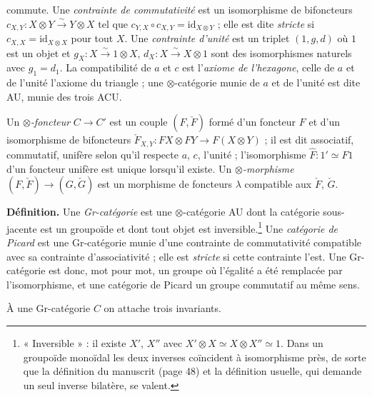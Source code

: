 \documentclass[11pt,a4paper]{article}
\begin{document}
commute. Une \emph{contrainte de commutativité} est un isomorphisme de
bifoncteurs $c_{X,Y} : X \otimes Y \xrightarrow{\sim} Y \otimes X$ tel que
$c_{Y,X} \circ c_{X,Y} = \mathrm{id}_{X \otimes Y}$ ; elle est dite
\emph{stricte} si $c_{X,X} = \mathrm{id}_{X \otimes X}$ pour tout $X$. Une
\emph{contrainte d'unité} est un triplet $(1, g, d)$ où $1$ est un objet et
$g_{X} : X \xrightarrow{\sim} 1 \otimes X$, $d_{X} : X \xrightarrow{\sim} X
\otimes 1$ sont des isomorphismes naturels avec $g_{1} = d_{1}$. La
compatibilité de $a$ et $c$ est l'\emph{axiome de l'hexagone}, celle de $a$ et
de l'unité l'axiome du triangle ; une $\otimes$-catégorie munie de $a$ et de
l'unité est dite AU, munie des trois ACU.

Un \emph{$\otimes$-foncteur} $C \to C'$ est un couple $(F, \check{F})$ formé
d'un foncteur $F$ et d'un isomorphisme de bifoncteurs $\check{F}_{X,Y} : FX
\otimes FY \to F(X \otimes Y)$ ; il est dit associatif, commutatif, unifère
selon qu'il respecte $a$, $c$, l'unité ; l'isomorphisme $\hat{F} : 1' \simeq
F1$ d'un foncteur unifère est unique lorsqu'il existe. Un
\emph{$\otimes$-morphisme} $(F,\check{F}) \to (G,\check{G})$ est un morphisme
de foncteurs $\lambda$ compatible aux $\check{F}$, $\check{G}$.

\textbf{Définition.} Une \emph{Gr-catégorie} est une $\otimes$-catégorie AU
dont la catégorie sous-jacente est un groupoïde et dont tout objet est
inversible.\footnote{« Inversible » : il existe $X'$, $X''$ avec $X' \otimes X
\simeq X \otimes X'' \simeq 1$. Dans un groupoïde monoïdal les deux inverses
coïncident à isomorphisme près, de sorte que la définition du manuscrit
(page 48) et la définition usuelle, qui demande un seul inverse bilatère, se
valent.} Une \emph{catégorie de Picard} est une Gr-catégorie munie d'une
contrainte de commutativité compatible avec sa contrainte d'associativité ;
elle est \emph{stricte} si cette contrainte l'est. Une Gr-catégorie est donc,
mot pour mot, un groupe où l'égalité a été remplacée par l'isomorphisme, et
une catégorie de Picard un groupe commutatif au même sens.

À une Gr-catégorie $C$ on attache trois invariants.
\end{document}
